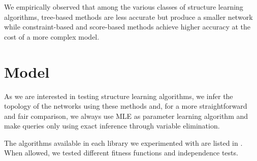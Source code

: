 \documentclass[letterpaper]{article}
\begin{document}
We empirically observed that among the various classes of structure learning algorithms, 
tree-based methods are less accurate but produce a smaller network while
constraint-based and score-based methods achieve higher accuracy at the cost of a more complex model.



\section{Model}

As we are interested in testing structure learning algorithms, 
we infer the topology of the networks using these methods and, 
for a more straightforward and fair comparison, we always use MLE as parameter learning algorithm and
make queries only using exact inference through variable elimination.

The algorithms available in each library we experimented with are listed in .
When allowed, we tested different fitness functions and independence tests.
\end{document}
